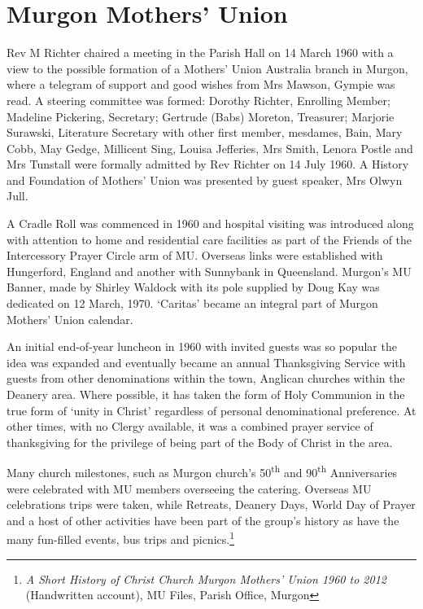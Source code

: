 \section{Murgon Mothers' Union}



Rev M Richter chaired a meeting in the Parish Hall on 14 March 1960 with a view to the possible formation of a Mothers' Union Australia branch in Murgon, where a telegram of support and good wishes from Mrs Mawson, Gympie was read. A steering committee was formed: Dorothy Richter, Enrolling Member; Madeline Pickering, Secretary; Gertrude (Babs) Moreton, Treasurer; Marjorie Surawski, Literature Secretary with other first member, mesdames, Bain, Mary Cobb, May Gedge, Millicent Sing, Louisa Jefferies, Mrs Smith, Lenora Postle and Mrs Tunstall were formally admitted by Rev Richter on 14 July 1960. A History and Foundation of Mothers' Union was presented by guest speaker, Mrs Olwyn Jull.



A Cradle Roll was commenced in 1960 and hospital visiting was introduced along with attention to home and residential care facilities as part of the Friends of the Intercessory Prayer Circle arm of MU. Overseas links were established with Hungerford, England and another with Sunnybank in Queensland. Murgon's MU Banner, made by Shirley Waldock with its pole supplied by Doug Kay was dedicated on 12 March, 1970. `Caritas' became an integral part of Murgon Mothers' Union calendar.



An initial end-of-year luncheon in 1960 with invited guests was so popular the idea was expanded and eventually became an annual Thanksgiving Service with guests from other denominations within the town, Anglican churches within the Deanery area. Where possible, it has taken the form of Holy Communion in the true form of `unity in Christ' regardless of personal denominational preference. At other times, with no Clergy available, it was a combined prayer service of thanksgiving for the privilege of being part of the Body of Christ in the area.



Many church milestones, such as Murgon church's 50\textsuperscript{th} and 90\textsuperscript{th} Anniversaries were celebrated with MU members overseeing the catering. Overseas MU celebrations trips were taken, while Retreats, Deanery Days, World Day of Prayer and a host of other activities have been part of the group's history as have the many fun-filled events, bus trips and picnics.\footnote{\emph{A Short History of Christ Church Murgon Mothers' Union 1960 to 2012} (Handwritten account), MU Files, Parish Office, Murgon}


